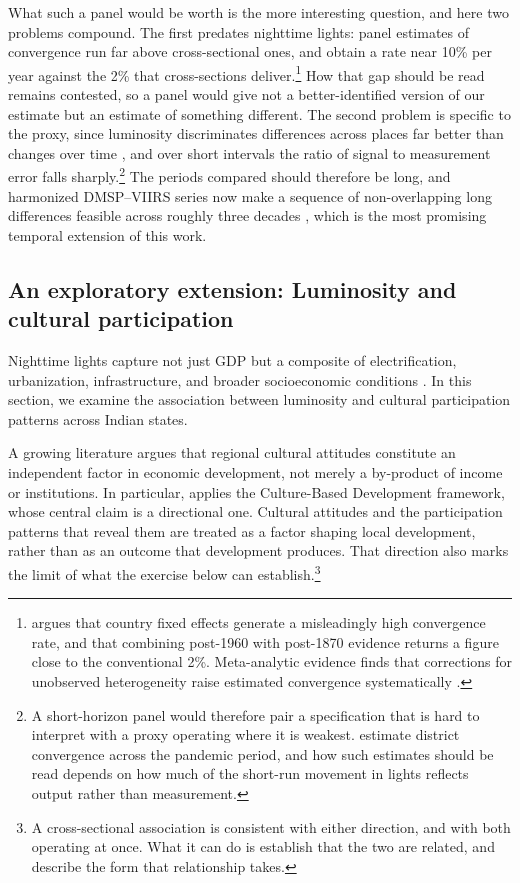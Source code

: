 \documentclass[
  a4paper, 
  twoside,
  final
]{article}
\begin{document}
What such a panel would be worth is the more interesting question, and
here two problems compound. The first predates nighttime lights: panel
estimates of convergence run far above cross-sectional ones, and
\citet{caselli_etal_convergence_debate} obtain a rate near 10\% per year
against the 2\% that cross-sections deliver.\footnote{\citet{barro_convergence_modernisation}
  argues that country fixed effects generate a misleadingly high
  convergence rate, and that combining post-1960 with post-1870 evidence
  returns a figure close to the conventional 2\%. Meta-analytic evidence
  finds that corrections for unobserved heterogeneity raise estimated
  convergence systematically \citep{abreu_etal_meta_convergence}.} How
that gap should be read remains contested, so a panel would give not a
better-identified version of our estimate but an estimate of something
different. The second problem is specific to the proxy, since luminosity
discriminates differences across places far better than changes over
time \citep{chen_nordhaus_viirs_crosssection, asher_shrug_india}, and
over short intervals the ratio of signal to measurement error falls
sharply.\footnote{A short-horizon panel would therefore pair a
  specification that is hard to interpret with a proxy operating where
  it is weakest. \citet{chakrabarty_mukherjee_covid_convergence}
  estimate district convergence across the pandemic period, and how such
  estimates should be read depends on how much of the short-run movement
  in lights reflects output rather than measurement.} The periods
compared should therefore be long, and harmonized DMSP--VIIRS series now
make a sequence of non-overlapping long differences feasible across
roughly three decades \citep{li_etal_harmonization}, which is the most
promising temporal extension of this work.

\subsection{An exploratory extension: Luminosity and cultural
participation}\label{an-exploratory-extension-luminosity-and-cultural-participation}

Nighttime lights capture not just GDP but a composite of
electrification, urbanization, infrastructure, and broader socioeconomic
conditions
\citep{henderson_storeygard_weil_lights, mellander_etal_lights_gdp}. In
this section, we examine the association between luminosity and cultural
participation patterns across Indian states.

A growing literature argues that regional cultural attitudes constitute
an independent factor in economic development, not merely a by-product
of income or institutions. In particular,
\citet{tubadji_cultural_entropy} applies the Culture-Based Development
framework, whose central claim is a directional one. Cultural attitudes
and the participation patterns that reveal them are treated as a factor
shaping local development, rather than as an outcome that development
produces. That direction also marks the limit of what the exercise below
can establish.\footnote{A cross-sectional association is consistent with
  either direction, and with both operating at once. What it can do is
  establish that the two are related, and describe the form that
  relationship takes.}
\end{document}
